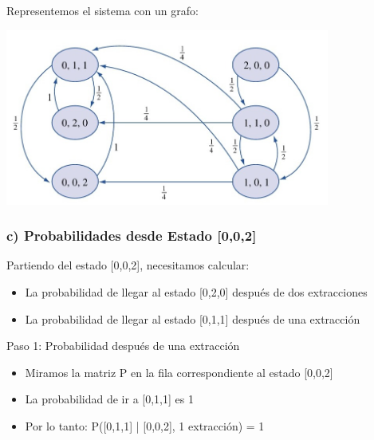 \documentclass[12pt]{article}
\begin{document}
Representemos el sistema con un grafo:

\begin{center}
    \includegraphics[width=0.8\textwidth]{img/grafo_esferas.jpeg}
\end{center}

\subsubsection{c) Probabilidades desde Estado [0,0,2]}

Partiendo del estado [0,0,2], necesitamos calcular:
\begin{itemize}
    \item La probabilidad de llegar al estado [0,2,0] después de dos extracciones
    \item La probabilidad de llegar al estado [0,1,1] después de una extracción
\end{itemize}

Paso 1: Probabilidad después de una extracción
\begin{itemize}
    \item Miramos la matriz P en la fila correspondiente al estado [0,0,2]
    \item La probabilidad de ir a [0,1,1] es 1
    \item Por lo tanto: P([0,1,1] | [0,0,2], 1 extracción) = 1
\end{itemize}
\end{document}
